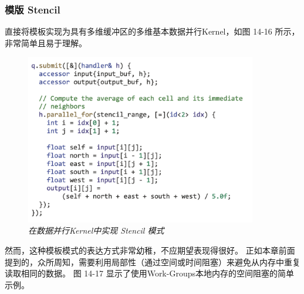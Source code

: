\subsubsection{模版 Stencil}
直接将模板实现为具有多维缓冲区的多维基本数据并行Kernel，如图 14-16 所示，非常简单且易于理解。

\begin{figure}[H]
	\centering
	\includegraphics[width=0.9\textwidth]{figs/F14.16.png}
	\caption{\textit{在数据并行Kernel中实现 Stencil 模式 }}
\end{figure}

然而，这种模板模式的表达方式非常幼稚，不应期望表现得很好。 
正如本章前面提到的，众所周知，需要利用局部性（通过空间或时间阻塞）来避免从内存中重复读取相同的数据。 
图 14-17 显示了使用Work-Groups本地内存的空间阻塞的简单示例。


